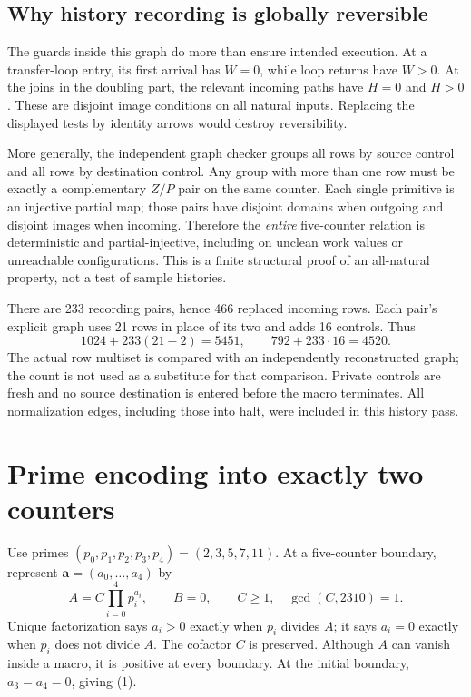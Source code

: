 \documentclass[11pt,a4paper]{article}
\numberwithin{equation}{section}
\begin{document}
\subsection{Why history recording is globally reversible}
The guards inside this graph do more than ensure intended execution. At a
transfer-loop entry, its first arrival has $W=0$, while loop returns have
$W>0$. At the joins in the doubling part, the relevant incoming paths have
$H=0$ and $H>0$. These are disjoint image conditions on all natural inputs.
Replacing the displayed tests by identity arrows would destroy reversibility.

More generally, the independent graph checker groups all rows by source
control and all rows by destination control. Any group with more than one row
must be exactly a complementary $Z/P$ pair on the same counter. Each single
primitive is an injective partial map; those pairs have disjoint domains
when outgoing and disjoint images when incoming. Therefore the \emph{entire}
five-counter relation is deterministic and partial-injective, including on
unclean work values or unreachable configurations. This is a finite structural
proof of an all-natural property, not a test of sample histories.

There are 233 recording pairs, hence 466 replaced incoming rows. Each pair's
explicit graph uses 21 rows in place of its two and adds 16 controls. Thus
\[
 1024+233(21-2)=5451,\qquad 792+233\cdot16=4520.          \tag{11}
\]
The actual row multiset is compared with an independently reconstructed graph;
the count is not used as a substitute for that comparison. Private controls
are fresh and no source destination is entered before the macro terminates.
All normalization edges, including those into halt, were included in this
history pass.
\section{Prime encoding into exactly two counters}\label{fpa:ls:sec:primes}
Use primes $(p_0,p_1,p_2,p_3,p_4)=(2,3,5,7,11)$. At a five-counter
boundary, represent $\mathbf a=(a_0,\ldots,a_4)$ by
\[
 A=C\prod_{i=0}^4p_i^{a_i},\qquad B=0,
 \qquad C\ge1,\quad\gcd(C,2310)=1.                    \tag{12}\label{fpa:ls:eq:prime}
\]
Unique factorization says $a_i>0$ exactly when $p_i$ divides $A$; it says
$a_i=0$ exactly when $p_i$ does not divide $A$. The cofactor $C$ is preserved.
Although $A$ can vanish inside a macro, it is positive at every boundary.
At the initial boundary, $a_3=a_4=0$, giving (1).
\end{document}
